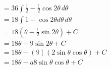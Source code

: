 \documentclass[preview]{standalone}
\begin{document}
\begin{align*}
&=36 \int \frac{1}{2} - \frac{1}{2}\cos2\theta \, d\theta \\ &=18 \int 1-\cos2\theta d\theta \, d\theta \\ &=18(\theta-\frac{1}{2}\sin2\theta) + C \\ &=18\theta-9\sin2\theta +C \\ &=18\theta-(9)(2\sin\theta\cos\theta) + C \\ &=18\theta-a8\sin\theta\cos\theta +C
\end{align*}
\end{document}
